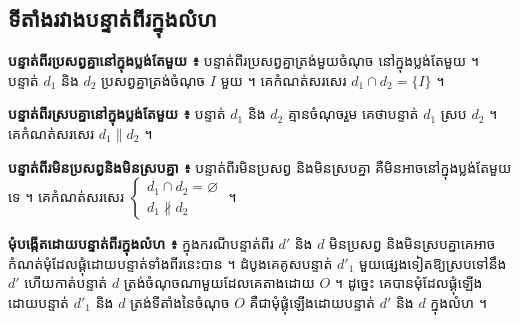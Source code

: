 \subsection{ទីតាំងរវាងបន្ទាត់ពីរក្នុងលំហ}
\textbf{បន្ទាត់ពីរប្រសព្វគ្នានៅក្នុងប្លង់តែមួយ ៖} បន្ទាត់ពីរប្រសព្វគ្នាត្រង់មួយចំណុច នៅក្នុងប្លង់តែមួយ ។ បន្ទាត់ $d_1$ និង $d_2$ ប្រសព្វគ្នាត្រង់ចំណុច $I$ មួយ ។ គេកំណត់សរសេរ $d_1 \cap d_2 = \{I\}$ ។

\textbf{បន្ទាត់ពីរស្របគ្នានៅក្នុងប្លង់តែមួយ ៖} បន្ទាត់ $d_1$ និង $d_2$ គ្មានចំណុចរួម គេថាបន្ទាត់ $d_1$ ស្រប $d_2$ ។ គេកំណត់សរសេរ $d_1 \parallel d_2$ ។

\textbf{បន្ទាត់ពីរមិនប្រសព្វនិងមិនស្របគ្នា ៖} បន្ទាត់ពីរមិនប្រសព្វ និងមិនស្របគ្នា គឺមិនអាចនៅក្នុងប្លង់តែមួយទេ ។ គេកំណត់សរសេរ $\begin{cases} d_1 \cap d_2 = \varnothing\\ d_1 \nparallel d_2 \end{cases}$ ។
\begin{center}
\end{center}

\textbf{មុំបង្កើតដោយបន្ទាត់ពីរក្នុងលំហ ៖} ក្នុងករណីបន្ទាត់ពីរ $d'$ និង $d$ មិនប្រសព្វ និងមិនស្របគ្នាគេអាចកំណត់មុំដែលផ្គុំដោយបន្ទាត់ទាំងពីរនេះបាន ។ ដំបូងគេគូសបន្ទាត់ $d'_1$ មួយផ្សេងទៀតឱ្យស្របទៅនឹង $d'$ ហើយកាត់បន្ទាត់ $d$ ត្រង់ចំណុចណាមួយដែលគេតាងដោយ $O$ ។ ដូច្នេះ គេបានមុំដែលផ្គុំឡើងដោយបន្ទាត់ $d'_1$ និង $d$ ត្រង់ទីតាំងនៃចំណុច $O$ គឺជាមុំផ្គុំឡើងដោយបន្ទាត់ $d'$ និង $d$ ក្នុងលំហ ។

